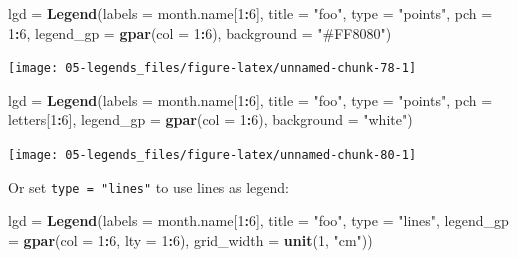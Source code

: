 \documentclass[]{book}
\newenvironment{Shaded}{\begin{snugshade}}{\end{snugshade}}
\newcommand{\KeywordTok}[1]{\textcolor[rgb]{0.13,0.29,0.53}{\textbf{#1}}}
\newcommand{\DataTypeTok}[1]{\textcolor[rgb]{0.13,0.29,0.53}{#1}}
\newcommand{\DecValTok}[1]{\textcolor[rgb]{0.00,0.00,0.81}{#1}}
\newcommand{\StringTok}[1]{\textcolor[rgb]{0.31,0.60,0.02}{#1}}
\newcommand{\OperatorTok}[1]{\textcolor[rgb]{0.81,0.36,0.00}{\textbf{#1}}}
\newcommand{\NormalTok}[1]{#1}
\theoremstyle{definition}
\theoremstyle{definition}
\theoremstyle{definition}
\theoremstyle{remark}
\begin{document}
\begin{Shaded}
\begin{Highlighting}[]
\NormalTok{lgd =}\StringTok{ }\KeywordTok{Legend}\NormalTok{(}\DataTypeTok{labels =}\NormalTok{ month.name[}\DecValTok{1}\OperatorTok{:}\DecValTok{6}\NormalTok{], }\DataTypeTok{title =} \StringTok{"foo"}\NormalTok{, }\DataTypeTok{type =} \StringTok{"points"}\NormalTok{, }
    \DataTypeTok{pch =} \DecValTok{1}\OperatorTok{:}\DecValTok{6}\NormalTok{, }\DataTypeTok{legend_gp =} \KeywordTok{gpar}\NormalTok{(}\DataTypeTok{col =} \DecValTok{1}\OperatorTok{:}\DecValTok{6}\NormalTok{), }\DataTypeTok{background =} \StringTok{"#FF8080"}\NormalTok{)}
\end{Highlighting}
\end{Shaded}

\begin{center}\texttt{[image: 05-legends\_files/figure-latex/unnamed-chunk-78-1]} \end{center}

\begin{Shaded}
\begin{Highlighting}[]
\NormalTok{lgd =}\StringTok{ }\KeywordTok{Legend}\NormalTok{(}\DataTypeTok{labels =}\NormalTok{ month.name[}\DecValTok{1}\OperatorTok{:}\DecValTok{6}\NormalTok{], }\DataTypeTok{title =} \StringTok{"foo"}\NormalTok{, }\DataTypeTok{type =} \StringTok{"points"}\NormalTok{, }
    \DataTypeTok{pch =}\NormalTok{ letters[}\DecValTok{1}\OperatorTok{:}\DecValTok{6}\NormalTok{], }\DataTypeTok{legend_gp =} \KeywordTok{gpar}\NormalTok{(}\DataTypeTok{col =} \DecValTok{1}\OperatorTok{:}\DecValTok{6}\NormalTok{), }\DataTypeTok{background =} \StringTok{"white"}\NormalTok{)}
\end{Highlighting}
\end{Shaded}

\begin{center}\texttt{[image: 05-legends\_files/figure-latex/unnamed-chunk-80-1]} \end{center}

Or set \texttt{type\ =\ "lines"} to use lines as legend:

\begin{Shaded}
\begin{Highlighting}[]
\NormalTok{lgd =}\StringTok{ }\KeywordTok{Legend}\NormalTok{(}\DataTypeTok{labels =}\NormalTok{ month.name[}\DecValTok{1}\OperatorTok{:}\DecValTok{6}\NormalTok{], }\DataTypeTok{title =} \StringTok{"foo"}\NormalTok{, }\DataTypeTok{type =} \StringTok{"lines"}\NormalTok{, }
    \DataTypeTok{legend_gp =} \KeywordTok{gpar}\NormalTok{(}\DataTypeTok{col =} \DecValTok{1}\OperatorTok{:}\DecValTok{6}\NormalTok{, }\DataTypeTok{lty =} \DecValTok{1}\OperatorTok{:}\DecValTok{6}\NormalTok{), }\DataTypeTok{grid_width =} \KeywordTok{unit}\NormalTok{(}\DecValTok{1}\NormalTok{, }\StringTok{"cm"}\NormalTok{))}
\end{Highlighting}
\end{Shaded}
\end{document}
